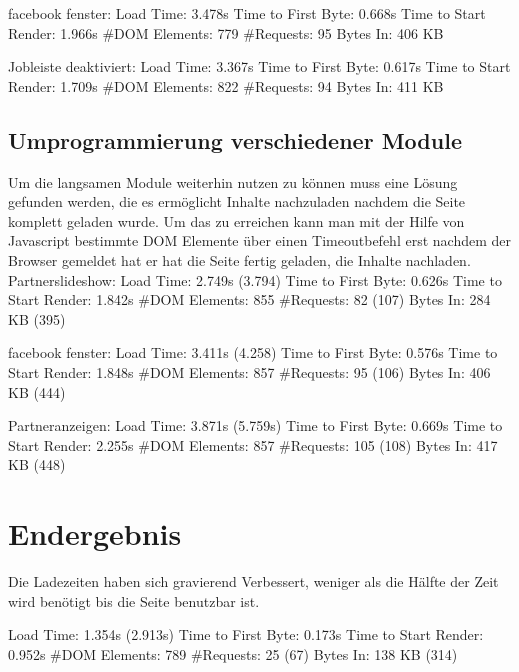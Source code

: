 facebook fenster:
Load Time: 3.478s
Time to First Byte: 0.668s %
Time to Start Render: 1.966s
\#DOM Elements: 779 	
\#Requests: 95 
Bytes In: 406 KB 

Jobleiste deaktiviert:
Load Time: 3.367s
Time to First Byte: 0.617s %
Time to Start Render: 1.709s
\#DOM Elements: 822 	
\#Requests: 94 
Bytes In: 411 KB

\subsection{Umprogrammierung verschiedener Module}
Um die langsamen Module weiterhin nutzen zu können muss eine Lösung gefunden werden, die es ermöglicht Inhalte nachzuladen nachdem die Seite komplett geladen wurde. Um das zu erreichen kann man mit der Hilfe von Javascript bestimmte DOM Elemente über einen Timeoutbefehl erst nachdem der Browser gemeldet hat er hat die Seite fertig geladen, die Inhalte nachladen.
Partnerslideshow:
Load Time: 2.749s (3.794)
Time to First Byte: 0.626s %
Time to Start Render: 1.842s
\#DOM Elements: 855 	
\#Requests: 82 (107)
Bytes In: 284 KB (395)

facebook fenster:
Load Time: 3.411s (4.258)
Time to First Byte: 0.576s %
Time to Start Render: 1.848s
\#DOM Elements: 857
\#Requests: 95 (106)
Bytes In: 406 KB (444)

Partneranzeigen:
Load Time: 3.871s (5.759s)
Time to First Byte: 0.669s %
Time to Start Render: 2.255s
\#DOM Elements: 857 	
\#Requests: 105 (108)
Bytes In: 417 KB (448)


\section{Endergebnis}
Die Ladezeiten haben sich gravierend Verbessert, weniger als die Hälfte der Zeit wird benötigt bis die Seite benutzbar ist.

Load Time: 1.354s (2.913s)
Time to First Byte: 0.173s %
Time to Start Render: 0.952s
\#DOM Elements: 789 	
\#Requests: 25 (67)
Bytes In:  138 KB (314)
